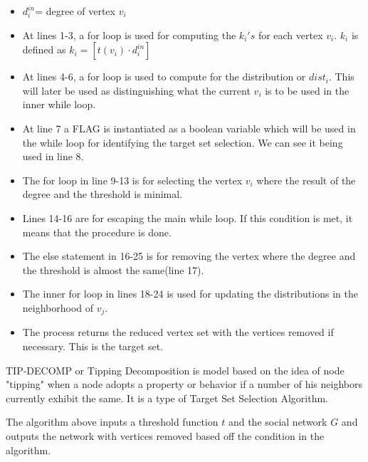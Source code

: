 \begin{itemize}
	\item $d_{i}^{in}$= degree of vertex $v_{i}$
	\item At lines 1-3, a for loop is used for computing the $k_{i}'s$ for each vertex $v_{i}$. $k_{i}$ is defined as  $k_{i}=[t(v_{i})\cdot d_{i}^{in}]$
	\item At lines 4-6, a for loop is used to compute for the distribution or $dist_{i}$. This will later be used as distinguishing what the current $v_{i}$ is to be used in the inner while loop.
	\item At line 7 a FLAG is instantiated as a boolean variable which will be used in the while loop for identifying the target set selection. We can see it being used in line 8.
	\item The for loop in line 9-13 is for selecting the vertex $v_{i}$ where the result of the degree and the threshold is minimal.
	\item Lines 14-16 are for escaping the main while loop. If this condition is met, it means that the procedure is done.
	\item The else statement in 16-25 is for removing the vertex where the degree and the threshold is almost the same(line 17).
	\item The inner for loop in lines 18-24 is used for updating the distributions in the neighborhood of $v_{j}$.
	\item The process returns the reduced vertex set with the vertices removed if necessary. This is the target set.
\end{itemize}
TIP-DECOMP or Tipping Decomposition is model based on the idea of node "tipping" when a node adopts a property or behavior if a number of his neighbors currently exhibit the same. It is a type of Target Set Selection Algorithm. 

The algorithm above inputs a threshold function $t$ and the social network $G$ and outputs the network with vertices removed based off the condition in the algorithm.\cite{tipdecomp}

